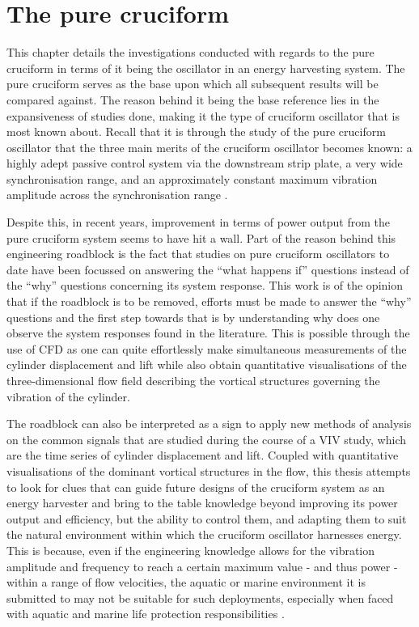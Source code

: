 \documentclass[oneside]{utmthesis}
\begin{document}
\section{The pure cruciform}\label{sec:svivRegime}
This chapter details the investigations conducted with regards to the pure cruciform in terms of it being the oscillator in an energy harvesting system. The pure cruciform serves as the base upon which all subsequent results will be compared against. The reason behind it being the base reference lies in the expansiveness of studies done, making it the type of cruciform oscillator that is most known about. Recall that it is through the study of the pure cruciform oscillator that the three main merits of the cruciform oscillator becomes known: a highly adept passive control system via the downstream strip plate, a very wide synchronisation range, and an approximately constant maximum vibration amplitude across the synchronisation range \citep{Koide2013}.

Despite this, in recent years, improvement in terms of power output from the pure cruciform system seems to have hit a wall. Part of the reason behind this engineering roadblock is the fact that studies on pure cruciform oscillators to date have been focussed on answering the ``what happens if'' questions instead of the ``why'' questions concerning its system response. This work is of the opinion that if the roadblock is to be removed, efforts must be made to answer the ``why'' questions and the first step towards that is by understanding why does one observe the system responses found in the literature. This is possible through the use of CFD as one can quite effortlessly make simultaneous measurements of the cylinder displacement and lift while also obtain quantitative visualisations of the three-dimensional flow field describing the vortical structures governing the vibration of the cylinder.

The roadblock can also be interpreted as a sign to apply new methods of analysis on the common signals that are studied during the course of a VIV study, which are the time series of cylinder displacement and lift. Coupled with quantitative visualisations of the dominant vortical structures in the flow, this thesis attempts to look for clues that can guide future designs of the cruciform system as an energy harvester and bring to the table knowledge beyond improving its power output and efficiency, but the ability to control them, and adapting them to suit the natural environment within which the cruciform oscillator harnesses energy. This is because, even if the engineering knowledge allows for the vibration amplitude and frequency to reach a certain maximum value - and thus power - within a range of flow velocities, the aquatic or marine environment it is submitted to may not be suitable for such deployments, especially when faced with aquatic and marine life protection responsibilities \citep{Raghavan2007a}.
\end{document}
